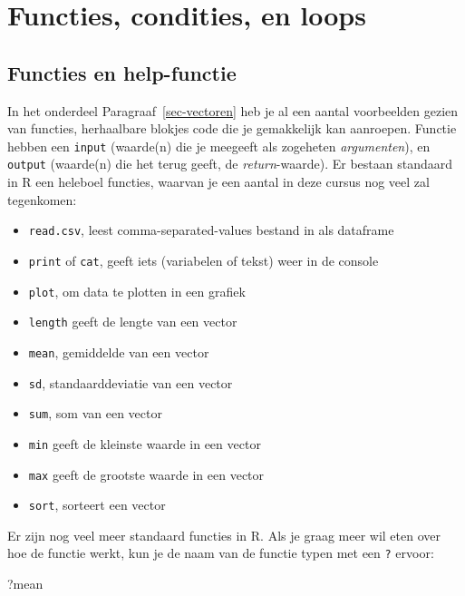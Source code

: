 \documentclass[
  a4paper,
]{scrbook}
\newenvironment{Shaded}{\begin{snugshade}}{\end{snugshade}}
\newcommand{\NormalTok}[1]{\textcolor[rgb]{0.00,0.23,0.31}{#1}}
\providecommand{\tightlist}{%
  \setlength{\itemsep}{0pt}\setlength{\parskip}{0pt}}\usepackage{longtable,booktabs,array}
\theoremstyle{definition}
\theoremstyle{remark}
\begin{document}
\hypertarget{functies-condities-en-loops}{%
\section{Functies, condities, en
loops}\label{functies-condities-en-loops}}

\hypertarget{sec-functies}{%
\subsection{Functies en help-functie}\label{sec-functies}}

In het onderdeel Paragraaf~\ref{sec-vectoren} heb je al een aantal
voorbeelden gezien van functies, herhaalbare blokjes code die je
gemakkelijk kan aanroepen. Functie hebben een \texttt{input} (waarde(n)
die je meegeeft als zogeheten \emph{argumenten}), en \texttt{output}
(waarde(n) die het terug geeft, de \emph{return}-waarde). Er bestaan
standaard in R een heleboel functies, waarvan je een aantal in deze
cursus nog veel zal tegenkomen:

\begin{itemize}
\tightlist
\item
  \texttt{read.csv}, leest comma-separated-values bestand in als
  dataframe
\item
  \texttt{print} of \texttt{cat}, geeft iets (variabelen of tekst) weer
  in de console
\item
  \texttt{plot}, om data te plotten in een grafiek
\item
  \texttt{length} geeft de lengte van een vector
\item
  \texttt{mean}, gemiddelde van een vector
\item
  \texttt{sd}, standaarddeviatie van een vector
\item
  \texttt{sum}, som van een vector
\item
  \texttt{min} geeft de kleinste waarde in een vector
\item
  \texttt{max} geeft de grootste waarde in een vector
\item
  \texttt{sort}, sorteert een vector
\end{itemize}

Er zijn nog veel meer standaard functies in R. Als je graag meer wil
eten over hoe de functie werkt, kun je de naam van de functie typen met
een \texttt{?} ervoor:

\begin{Shaded}
\begin{Highlighting}[]
\NormalTok{?mean}
\end{Highlighting}
\end{Shaded}
\end{document}
